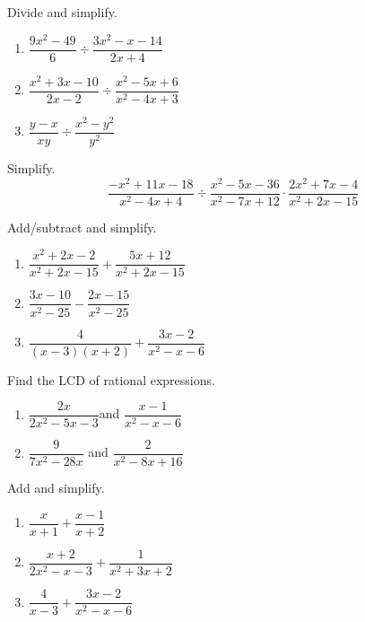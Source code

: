 \documentclass[en,11pt]{elegantbook}
\let\BeginKnitrBlock\begin \let\EndKnitrBlock\end
\begin{document}
\BeginKnitrBlock{exercise}
\protect\hypertarget{exr:unnamed-chunk-56}{}{\label{exr:unnamed-chunk-56} }
Divide and simplify.

\begin{enumerate}
\def\labelenumi{\arabic{enumi}.}
\item
  \(\dfrac{9x^2-49}{6}\div\dfrac{3x^2-x-14}{2x+4}\)
\item
  \(\dfrac{x^2+3x-10}{2x-2}\div\dfrac{x^2-5x+6}{x^2-4x+3}\)
\item
  \(\dfrac{y-x}{xy}\div\dfrac{x^2-y^2}{y^2}\)
\end{enumerate}
\EndKnitrBlock{exercise}

\BeginKnitrBlock{exercise}
\protect\hypertarget{exr:unnamed-chunk-57}{}{\label{exr:unnamed-chunk-57} }
Simplify.
\[
\frac{-x^2+11x-18}{x^2-4x+4}\div \frac{x^2-5x-36}{x^2-7x+12}\cdot \frac{2x^2+7x-4}{x^2+2x-15}
\]
\EndKnitrBlock{exercise}

\BeginKnitrBlock{exercise}
\protect\hypertarget{exr:unnamed-chunk-58}{}{\label{exr:unnamed-chunk-58} }
Add/subtract and simplify.

\begin{enumerate}
\def\labelenumi{\arabic{enumi}.}

\item
  \(\dfrac{x^2+2x-2}{x^2+2x-15}+\dfrac{5x+12}{x^2+2x-15}\)
\item
  \(\dfrac{3x-10}{x^2-25}-\dfrac{2x-15}{x^2-25}\)
\item
  \(\dfrac{4}{(x-3)(x+2)}+\dfrac{3x-2}{x^2-x-6}\)
\end{enumerate}
\EndKnitrBlock{exercise}

\BeginKnitrBlock{exercise}
\protect\hypertarget{exr:unnamed-chunk-59}{}{\label{exr:unnamed-chunk-59} }
Find the LCD of rational expressions.

\begin{enumerate}
\def\labelenumi{\arabic{enumi}.}

\item
  \(\dfrac{2x}{2x^2-5x-3}\)\quad and \quad \(\dfrac{x-1}{x^2-x-6}\)
\item
  \(\dfrac{9}{7x^2-28x}\) \quad and \quad \(\dfrac{2}{x^2-8x+16}\)
\end{enumerate}
\EndKnitrBlock{exercise}

\BeginKnitrBlock{exercise}
\protect\hypertarget{exr:unnamed-chunk-60}{}{\label{exr:unnamed-chunk-60} }
Add and simplify.

\begin{enumerate}
\def\labelenumi{\arabic{enumi}.}

\item
  \(\dfrac{x}{x+1}+\dfrac{x-1}{x+2}\)
\item
  \(\dfrac{x+2}{2x^2-x-3}+\dfrac{1}{x^2+3x+2}\)
\item
  \(\dfrac{4}{x-3}+\dfrac{3x-2}{x^2-x-6}\)
\end{enumerate}
\EndKnitrBlock{exercise}
\end{document}
